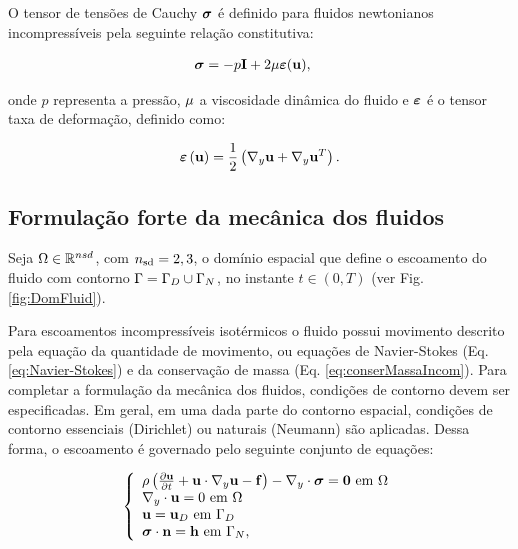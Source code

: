 \documentclass[tese_patricia]{subfiles}%
\begin{document}
O tensor de tensões de Cauchy $\boldsymbol{\sigma}$ é definido para fluidos newtonianos incompressíveis pela seguinte relação constitutiva:

\begin{align}
\boldsymbol{\sigma} &= -p\mathbf{I} + 2\mu\bm{\varepsilon}(\mathbf{u}),\label{eq:StressTensor}
\end{align}

\noindent onde $p$ representa a pressão, $\mu$ a viscosidade dinâmica do fluido e $\bm{\varepsilon}$ é o tensor taxa de deformação, definido como:


\begin{align}
\bm{\varepsilon}\left(\mathbf{u}\right) = \frac{1}{2}\left(\nabla_y\mathbf{u} + \nabla_y\mathbf{u}^{T}\right). 
\label{eq:StrainTensor}
\end{align}

\subsection{Formulação forte da mecânica dos fluidos}

Seja $\Omega \in \mathbb{R}^{nsd}$, com ${n_{\mathrm{sd}}} = 2,3$, o domínio espacial que define o escoamento do fluido com contorno $\Gamma = \Gamma_D \cup \Gamma_N$, no instante $t \in (0,T)$ (ver Fig. \ref{fig:DomFluid}).

Para escoamentos incompressíveis isotérmicos o fluido possui movimento descrito pela equação da quantidade de movimento, ou equações de Navier-Stokes (Eq. \ref{eq:Navier-Stokes}) e da conservação de massa (Eq. \ref{eq:conserMassaIncom}). Para completar a formulação da mecânica dos fluidos, condições de contorno devem ser especificadas. Em geral, em uma dada parte do contorno espacial, condições de contorno essenciais (Dirichlet) ou naturais (Neumann) são aplicadas. Dessa forma, o escoamento é governado pelo seguinte conjunto de equações:

\begin{equation}
	\left\{
	\begin{array}{l}
		\density\left(\frac{\partial\velocity}{\partial t} + \velocity\cdot\nabla_y\velocity - \sbodyforce \right) - \nabla_y \cdot \stresstensor = \mathbf{0} \ \textrm{em} \ \domain\\
		\nabla_y \cdot \velocity = 0 \ \textrm{em} \ \domain\\
		\velocity = \velocityD \ \textrm{em} \ \GammaD \\
		\stresstensor \cdot \snormal = \surfaceLoad \ \textrm{em} \ \GammaN,
	\end{array} \label{eq:ConjDFC}
	\right.
\end{equation}
\end{document}
